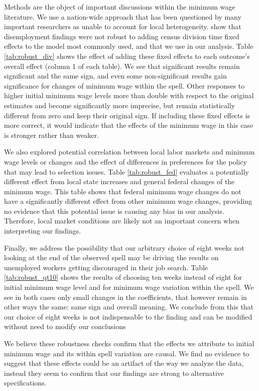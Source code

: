 \documentclass{article}
\begin{document}
Methods are the object of important discussions within the minimum wage literature. We use a nation-wide approach that has been questioned by many important researchers as unable to account for local heterogeneity. \cite{allegretto2011minimum} show that disemployment findings were not robust to adding census division time fixed effects to the model most commonly used, and that we use in our analysis. Table \ref{tab:robust_div} shows the effect of adding these fixed effects to each outcome's overall effect (column 1 of each table). We see that significant results remain significant and the same sign, and even some non-significant results gain significance for changes of minimum wage within the spell. Other responses to higher initial minimum wage levels more than double with respect to the original estimates and become significantly more imprecise, but remain statistically different from zero and keep their original sign. If including these fixed effects is more correct, it would indicate that the effects of the minimum wage in this case is stronger rather than weaker.

We also explored potential correlation between local labor markets and minimum wage levels or changes and the effect of differences in preferences for the policy that may lead to selection issues. Table \ref{tab:robust_fed} evaluates a potentially different effect from local state increases and general federal changes of the minimum wage. This table shows that federal minimum wage changes do not have a significantly different effect from other minimum wage changes, providing no evidence that this potential issue is causing any bias in our analysis. Therefore, local market conditions are likely not an important concern when interpreting our findings.

Finally, we address the possibility that our arbitrary choice of eight weeks not looking at the end of the observed spell may be driving the results on unemployed workers getting discouraged in their job search. Table \ref{tab:robust_qt10} shows the results of choosing ten weeks instead of eight for initial minimum wage level and for minimum wage variation within the spell. We see in both cases only small changes in the coefficients, that however remain in other ways the same: same sign and overall meaning. We conclude from this that our choice of eight weeks is not indispensable to the finding and can be modified without need to modify our conclusions

We believe these robustness checks confirm that the effects we attribute to initial minimum wage and its within spell variation are causal. We find no evidence to suggest that these effects could be an artifact of the way we analyze the data, instead they seem to confirm that our findings are strong to alternative specifications.
\FloatBarrier
\end{document}
